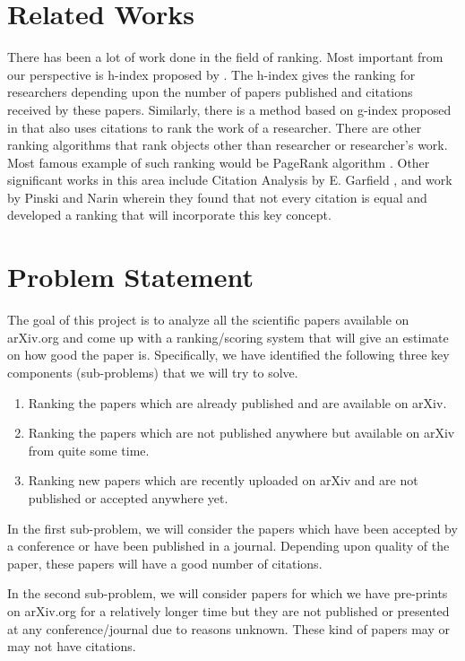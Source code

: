 \documentclass[a4paper, 11pt]{article}
\begin{document}
\section{Related Works}
There has been a lot of work done in the field of ranking. Most important from our perspective is h-index proposed by \cite{Hirsch}. The h-index gives the ranking for researchers depending upon the number of papers published and citations received by these papers.
Similarly, there is a method based on g-index proposed in \cite{gindex} that also uses citations to rank the work of a researcher. There are other ranking algorithms that rank objects other than researcher or researcher's work. Most famous example of such ranking would be PageRank algorithm \cite{pagerank}. Other significant works in this area include Citation Analysis by E. Garfield \cite{garfield}, and work by Pinski and Narin \cite{pinski} wherein they found that not every citation is equal and developed a ranking that will incorporate this key concept.

\section{Problem Statement}
The goal of this project is to analyze all the scientific papers available on arXiv.org and come up with a ranking/scoring system that will give an estimate on how good the paper is. Specifically, we have identified the following three key components (sub-problems) that we will try to solve.
\begin{enumerate}
\item Ranking the papers which are already published and are available on arXiv.
\item Ranking the papers which are not published anywhere but available on arXiv from quite some time.
\item Ranking new papers which are recently uploaded on arXiv and are not published or accepted anywhere yet.
\end{enumerate}

In the first sub-problem, we will consider the papers which have been accepted by a conference or have been published in a journal. Depending upon quality of the paper, these papers will have a good number of citations. 

In the second sub-problem, we will consider papers for which we have pre-prints on arXiv.org for a relatively longer time but they are not published or presented at any conference/journal due to reasons unknown. These kind of papers may or may not have citations.
\end{document}
